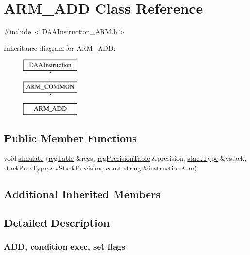 \hypertarget{classARM__ADD}{}\section{A\+R\+M\+\_\+\+A\+DD Class Reference}
\label{classARM__ADD}


{\ttfamily \#include $<$D\+A\+A\+Instruction\+\_\+\+A\+R\+M.\+h$>$}

Inheritance diagram for A\+R\+M\+\_\+\+A\+DD\+:\begin{figure}[H]
\begin{center}
\leavevmode
\includegraphics[height=3.000000cm]{classARM__ADD}
\end{center}
\end{figure}
\subsection*{Public Member Functions}
\begin{DoxyCompactItemize}
\item 
void \hyperlink{classARM__ADD_a8fd563bc37b1879fef93ee4ccbcfcafd}{simulate} (\hyperlink{DAAInstruction_8h_af0fae93a861de9cf37988d5673cac523}{reg\+Table} \&regs, \hyperlink{DAAInstruction_8h_a0e8cae02815a5f8adc750122d790b455}{reg\+Precision\+Table} \&precision, \hyperlink{DAAInstruction_8h_a1b0e70ac1a04f06c8132055ed01f589f}{stack\+Type} \&vstack, \hyperlink{DAAInstruction_8h_ac5cb793e9dac3fa9693da78b7e29ab30}{stack\+Prec\+Type} \&v\+Stack\+Precision, const string \&instruction\+Asm)
\end{DoxyCompactItemize}
\subsection*{Additional Inherited Members}


\subsection{Detailed Description}


 \subsubsection*{A\+DD, condition exec, set flags }

